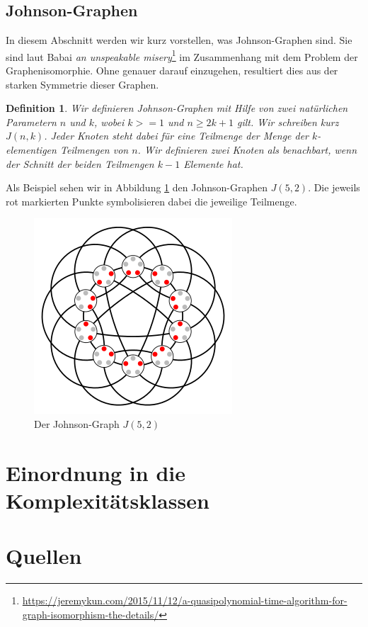 \documentclass[a4paper]{article}
\newtheorem{definition}{Definition}
\newcommand{\jeremykun}{\url{https://jeremykun.com/2015/11/12/a-quasipolynomial-time-algorithm-for-graph-isomorphism-the-details/}}
\begin{document}
\subsection{Johnson-Graphen}
In diesem Abschnitt werden wir kurz vorstellen, was Johnson-Graphen sind. Sie sind laut Babai \emph{an unspeakable misery}\footnote{\jeremykun} im Zusammenhang mit dem Problem der Graphenisomorphie. Ohne genauer darauf einzugehen, resultiert dies aus der starken Symmetrie dieser Graphen. 

\begin{definition}
Wir definieren Johnson-Graphen mit Hilfe von zwei natürlichen Parametern $n$ und $k$, wobei $k>=1$ und $n\geq 2k+1$ gilt. Wir schreiben kurz $J(n,k)$. Jeder Knoten steht dabei für eine Teilmenge der Menge der $k$-elementigen Teilmengen von $n$. Wir definieren zwei Knoten als benachbart, wenn der Schnitt der beiden Teilmengen $k-1$ Elemente hat. 
\end{definition}

Als Beispiel sehen wir in Abbildung \ref{fig:j52} den Johnson-Graphen $J(5,2)$. Die jeweils rot markierten Punkte symbolisieren dabei die jeweilige Teilmenge.

\begin{figure}[h]
\centering
\includegraphics[scale=0.5]{j52.png}
\caption{Der Johnson-Graph $J(5,2)$}\label{fig:j52}
\end{figure}

\section{Einordnung in die Komplexitätsklassen}\label{sec:complexity}

\clearpage
\section{Quellen}
\end{document}
